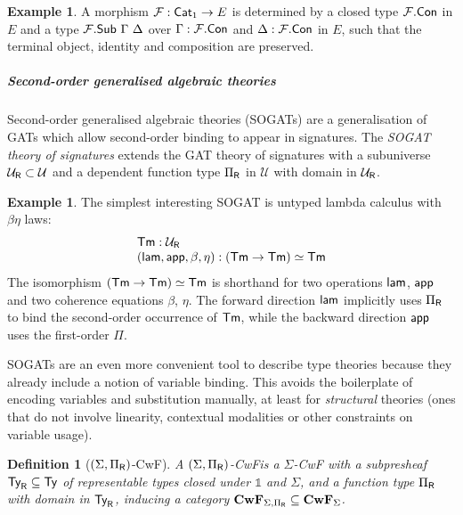\documentclass[10pt,a4paper]{article}
\newtheorem{definition}[theorem]{Definition}
\theoremstyle{definition}
\newtheorem{example}[theorem]{Example}
\theoremstyle{remark}
\newcommand{\s}[1]{{\ensuremath{\textsf{\upshape #1}}}\xspace}
\newcommand{\cl}[1]{{\ensuremath{\mathcal{#1}}}\xspace}
\newcommand{\re}[1]{{\ensuremath{\mathbf{#1}}}\xspace}
\newcommand{\Ty}{\s{Ty}}
\newcommand{\Tm}{\s{Tm}}
\newcommand{\univ}{\cl{U}}
\newcommand{\univR}{\cl{U}_{\mathsf{R}}}
\newcommand{\Unit}{\mathbb{1}}
\newcommand{\lR}{_\s{R}}
\begin{document}
\begin{example}
A morphism $\cl F : \s{Cat}_1 \to E$ is determined by a closed type $\cl
F.\s{Con}$ in $E$ and a type $\cl F.\s{Sub}\ \Gamma\ \Delta$ over $\Gamma : \cl
F.\s{Con}$ and $\Delta : \cl F.\s{Con}$ in $E$, such that the terminal object,
identity and composition are preserved.
\end{example}

\subparagraph{Second-order generalised algebraic theories}

Second-order generalised algebraic theories (SOGATs) \cite{Uemura2021-jq,Bocquet2025-ox} are a generalisation of
GATs which allow second-order binding to appear in signatures. The \emph{SOGAT
theory of signatures} extends the GAT theory of signatures with a subuniverse
$\univ\lR \subset \univ$ and a dependent function type $\Pi\lR$ in $\univ$ with
domain in $\univ\lR$.

\begin{example}
The simplest interesting SOGAT is untyped lambda calculus with $\beta\eta$ laws:
\begin{equation}\label{eq:lc-sogat}\begin{array}{l}
  \Tm : \univR \\
  (\s{lam}, \s{app}, \beta, \eta) : (\Tm \to \Tm) \simeq \Tm \end{array}
\end{equation}
The isomorphism $(\Tm \to \Tm) \simeq \Tm$ is shorthand for two operations
$\s{lam}$, $\s{app}$ and two coherence equations $\beta$, $\eta$. The forward
direction $\s{lam}$ implicitly uses $\Pi\lR$ to bind the second-order occurrence
of $\Tm$, while the backward direction $\s{app}$ uses the first-order $\Pi$.
\end{example}

SOGATs are an even more convenient tool to describe type theories because they
already include a notion of variable binding. This avoids the boilerplate of
encoding variables and substitution manually, at least for \emph{structural}
theories (ones that do not involve linearity, contextual modalities or other
constraints on variable usage).

\begin{definition}[$(\Sigma, \Pi\lR)$-CwF]
A \emph{$(\Sigma, \Pi\lR)$-CwF}\label{def:sigma-pir-cwf} is a $\Sigma$-CwF
  with a subpresheaf $\Ty\lR \subseteq \Ty$ of \emph{representable types}
  closed under $\Unit$ and $\Sigma$, and a function type $\Pi\lR$ with domain
  in $\Ty\lR$, inducing a category $\re{CwF}_{\Sigma, \Pi\lR} \subseteq
  \re{CwF}_\Sigma$.
\end{definition} 
\end{document}
